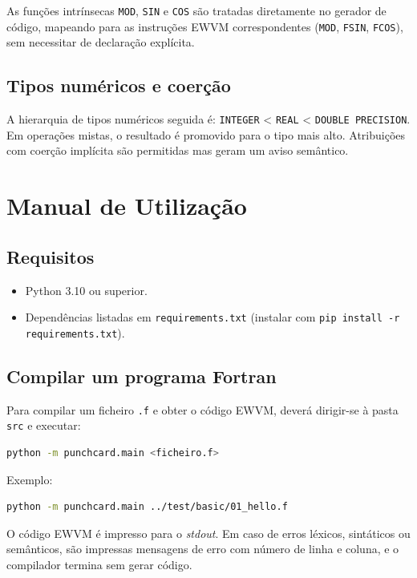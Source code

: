 \documentclass[11pt, a4paper, fleqn]{article}
\begin{document}
As funções intrínsecas \texttt{MOD}, \texttt{SIN} e \texttt{COS} são tratadas diretamente no gerador de código, mapeando para as instruções EWVM correspondentes (\texttt{MOD}, \texttt{FSIN}, \texttt{FCOS}), sem necessitar de declaração explícita.

\subsection{Tipos numéricos e coerção}

A hierarquia de tipos numéricos seguida é: \texttt{INTEGER} < \texttt{REAL} < \texttt{DOUBLE PRECISION}. Em operações mistas, o resultado é promovido para o tipo mais alto. Atribuições com coerção implícita são permitidas mas geram um aviso semântico.

\section{Manual de Utilização}

\subsection{Requisitos}

\begin{itemize}
    \item Python 3.10 ou superior.
    \item Dependências listadas em \texttt{requirements.txt} (instalar com \texttt{pip install -r requirements.txt}).
\end{itemize}

\subsection{Compilar um programa Fortran}

Para compilar um ficheiro \texttt{.f} e obter o código EWVM, deverá dirigir-se à pasta \texttt{src} e executar:

\begin{lstlisting}[language=bash]
python -m punchcard.main <ficheiro.f>
\end{lstlisting}

\noindent Exemplo:

\begin{lstlisting}[language=bash]
python -m punchcard.main ../test/basic/01_hello.f
\end{lstlisting}

\noindent O código EWVM é impresso para o \textit{stdout}. Em caso de erros léxicos, sintáticos ou semânticos, são impressas mensagens de erro com número de linha e coluna, e o compilador termina sem gerar código.
\end{document}
